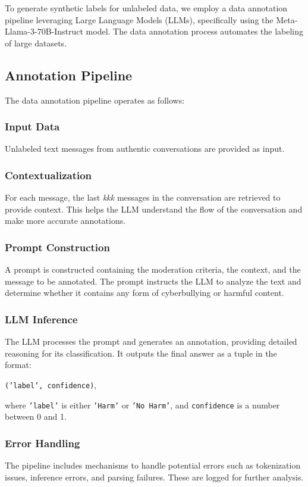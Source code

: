 
To generate synthetic labels for unlabeled data, we employ a data annotation pipeline leveraging Large Language Models (LLMs), specifically using the Meta-Llama-3-70B-Instruct model. The data annotation process automates the labeling of large datasets.

\subsection{Annotation Pipeline}
The data annotation pipeline operates as follows:

\subsubsection{Input Data}
Unlabeled text messages from authentic conversations are provided as input.

\subsubsection{Contextualization}
For each message, the last \textit{kkk} messages in the conversation are retrieved to provide context. This helps the LLM understand the flow of the conversation and make more accurate annotations.

\subsubsection{Prompt Construction}
A prompt is constructed containing the moderation criteria, the context, and the message to be annotated. The prompt instructs the LLM to analyze the text and determine whether it contains any form of cyberbullying or harmful content.

\subsubsection{LLM Inference}
The LLM processes the prompt and generates an annotation, providing detailed reasoning for its classification. It outputs the final answer as a tuple in the format:
\begin{center}
\texttt{('label', confidence)},
\end{center}
where \texttt{'label'} is either \texttt{'Harm'} or \texttt{'No Harm'}, and \texttt{confidence} is a number between 0 and 1.

\subsubsection{Error Handling}
The pipeline includes mechanisms to handle potential errors such as tokenization issues, inference errors, and parsing failures. These are logged for further analysis.
